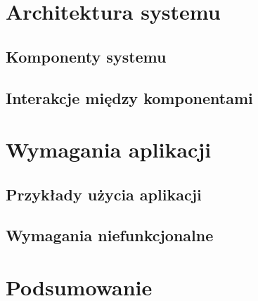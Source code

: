 \section{Architektura systemu} 




\subsection{Komponenty systemu}

\subsection{Interakcje między komponentami}





\section{Wymagania aplikacji} %



\subsection{Przykłady użycia aplikacji}


\subsection{Wymagania niefunkcjonalne}


\section{Podsumowanie}

